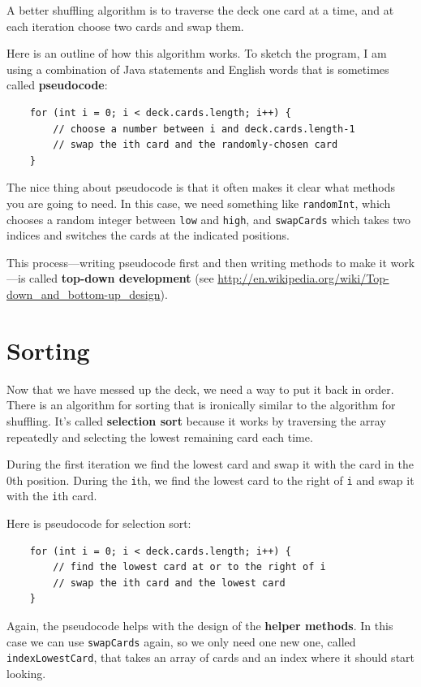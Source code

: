 \documentclass[12pt]{book}
\theoremstyle{exercise}
\begin{document}
A better shuffling algorithm is to traverse the deck one card at a
time, and at each iteration choose two cards and swap them.

Here is an outline of how this algorithm works.  To sketch the
program, I am using a combination of Java statements and English
words that is sometimes called {\bf pseudocode}:  

\begin{lstlisting}
    for (int i = 0; i < deck.cards.length; i++) {
        // choose a number between i and deck.cards.length-1
        // swap the ith card and the randomly-chosen card
    }
\end{lstlisting}
%
The nice thing about pseudocode is that it often makes it
clear what methods you are going to need.  In this case, we
need something like {\tt randomInt}, which chooses a random
integer between {\tt low} and {\tt high},
and {\tt swapCards} which takes two indices and switches the
cards at the indicated positions.

This process---writing pseudocode first and then writing
methods to make it work---is called {\bf top-down development}
(see \url{http://en.wikipedia.org/wiki/Top-down_and_bottom-up_design}).


\section{Sorting}
\label{sorting}

Now that we have messed up the deck, we need a way to put it back in
order.  There is an algorithm for sorting that is ironically similar
to the algorithm for shuffling.  It's called {\bf selection sort}
because it works by traversing the array repeatedly and selecting the
lowest remaining card each time.

During the first iteration we find the lowest card and swap
it with the card in the 0th position.  During the {\tt i}th, we find the
lowest card to the right of {\tt i} and swap it with the {\tt i}th
card.

Here is pseudocode for selection sort:

\begin{lstlisting}
    for (int i = 0; i < deck.cards.length; i++) {
        // find the lowest card at or to the right of i
        // swap the ith card and the lowest card
    }
\end{lstlisting}
%
Again, the pseudocode helps with the design of the {\bf helper
methods}.  In this case we can use {\tt swapCards} again,
so we only need one new one, called {\tt indexLowestCard},
that takes an array of cards and an index where it should
start looking.
\end{document}

